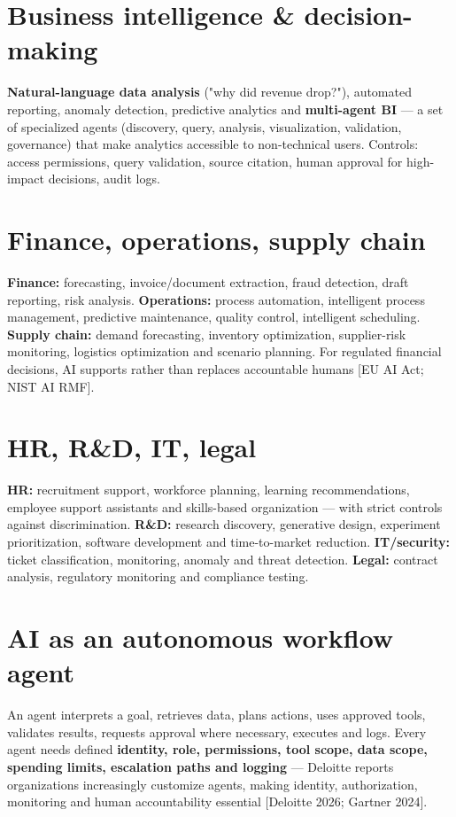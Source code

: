 \section{Business intelligence \& decision-making}

\textbf{Natural-language data analysis} ("why did revenue drop?"), automated
reporting, anomaly detection, predictive analytics and \textbf{multi-agent BI}
— a set of specialized agents (discovery, query, analysis, visualization,
validation, governance) that make analytics accessible to non-technical users.
Controls: access permissions, query validation, source citation, human
approval for high-impact decisions, audit logs.

\section{Finance, operations, supply chain}

\textbf{Finance:} forecasting, invoice/document extraction, fraud detection,
draft reporting, risk analysis. \textbf{Operations:} process automation,
intelligent process management, predictive maintenance, quality control,
intelligent scheduling. \textbf{Supply chain:} demand forecasting, inventory
optimization, supplier-risk monitoring, logistics optimization and scenario
planning. For regulated financial decisions, AI supports rather than replaces
accountable humans [EU AI Act; NIST AI RMF].

\section{HR, R\&D, IT, legal}

\textbf{HR:} recruitment support, workforce planning, learning
recommendations, employee support assistants and skills-based organization
— with strict controls against discrimination. \textbf{R\&D:} research
discovery, generative design, experiment prioritization, software
development and time-to-market reduction. \textbf{IT/security:} ticket
classification, monitoring, anomaly and threat detection. \textbf{Legal:}
contract analysis, regulatory monitoring and compliance testing.

\section{AI as an autonomous workflow agent}

An agent interprets a goal, retrieves data, plans actions, uses approved
tools, validates results, requests approval where necessary, executes and
logs. Every agent needs defined \textbf{identity, role, permissions, tool
scope, data scope, spending limits, escalation paths and logging} — Deloitte
reports organizations increasingly customize agents, making identity,
authorization, monitoring and human accountability essential
[Deloitte 2026; Gartner 2024].

